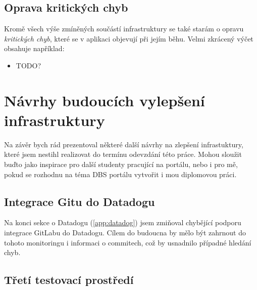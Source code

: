\subsection{Oprava kritických chyb}

Kromě všech výše zmíněných součástí infrastruktury se také starám o opravu \emph{kritických chyb}, které se v aplikaci objevují při jejím běhu. Velmi zkrácený výčet obsahuje například:
\begin{itemize}
	\item TODO?
\end{itemize}

\section{Návrhy budoucích vylepšení infrastruktury}

Na závěr bych rád prezentoval některé další návrhy na zlepšení infrastuktury, které jsem nestihl realizovat do termínu odevzdání této práce. Mohou sloužit buďto jako inspirace pro další studenty pracující na portálu, nebo i pro mě, pokud se rozhodnu na téma DBS portálu vytvořit i mou diplomovou práci.

\subsection{Integrace Gitu do Datadogu}

Na konci sekce o Datadogu (\ref{app:datadog}) jsem zmiňoval chybějící podporu integrace GitLabu do Datadogu. Cílem do budoucna by mělo být zahrnout do tohoto monitoringu i informaci o commitech, což by usnadnilo případné hledání chyb.

\subsection{Třetí testovací prostředí}

